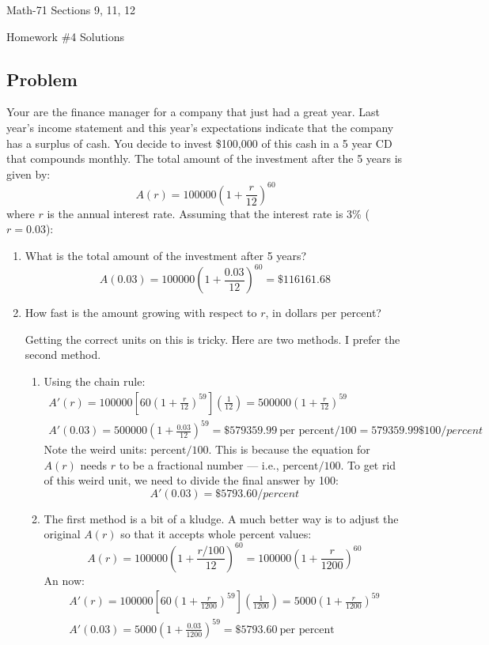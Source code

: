 \documentclass[letterpaper,12pt,fleqn]{article}
\begin{document}
\begin{center}
  \large
  Math-71 Sections 9, 11, 12

  \Large
  Homework \#4 Solutions
\end{center}

\subsection*{Problem}

Your are the finance manager for a company that just had a great year.  Last year's income statement and this year's
expectations indicate that the company has a surplus of cash.  You decide to invest \$100,000 of this cash in a 5 year CD that
compounds monthly.  The total amount of the investment after the 5 years is given by:
\[A(r)=100000\left(1+\frac{r}{12}\right)^{60}\]
where \(r\) is the annual interest rate. Assuming that the interest rate is 3\% (\(r=0.03\)):
\begin{enumerate}
\item What is the total amount of the investment after 5 years?
  \[A(0.03)=100000\left(1+\frac{0.03}{12}\right)^{60}=\$116161.68\]
\item How fast is the amount growing with respect to \(r\), in dollars per percent?

  Getting the correct units on this is tricky.  Here are two methods.  I prefer the second method.

  \begin{enumerate}
    \item Using the chain rule:
      \begin{gather*}
        A'(r)=100000\left[60\left(1+\frac{r}{12}\right)^{59}\right]\left(\frac{1}{12}\right)=
        500000\left(1+\frac{r}{12}\right)^{59} \\
        A'(0.03)=500000\left(1+\frac{0.03}{12}\right)^{59}=\$579359.99\ \text{per percent}/100=579359.99 \$100/percent
      \end{gather*}
      Note the weird units: \(\text{percent}/100\).  This is because the equation for \(A(r)\) needs \(r\) to be a
      fractional number --- i.e., \(\text{percent}/100\).  To get rid of this weird unit, we need to divide the final
      answer by 100:
      \[A'(0.03)=\$5793.60/percent\]

    \item The first method is a bit of a kludge.  A much better way is to adjust the original \(A(r)\) so that it
      accepts whole percent values:
      \[A(r)=100000\left(1+\frac{r/100}{12}\right)^{60}=100000\left(1+\frac{r}{1200}\right)^{60}\]
      An now:
      \begin{gather*}
        A'(r)=100000\left[60\left(1+\frac{r}{1200}\right)^{59}\right]\left(\frac{1}{1200}\right)=
        5000\left(1+\frac{r}{1200}\right)^{59} \\
        A'(0.03)=5000\left(1+\frac{0.03}{1200}\right)^{59}=\$5793.60\ \text{per percent}
      \end{gather*}
  \end{enumerate}
\end{enumerate}
\end{document}
